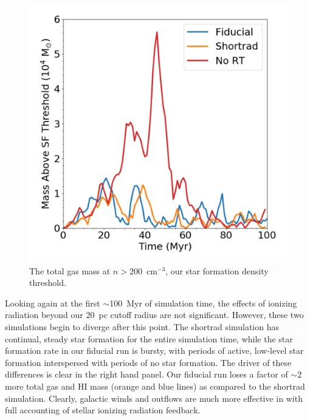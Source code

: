 \documentclass[twocolumn]{aastex62}
\begin{document}
\begin{figure}
\centering
\includegraphics[width=0.99\linewidth]{mass_density_cut}
\caption{The total gas mass at $n > 200$~cm$^{-3}$, our star formation density threshold.}
\label{fig:sf gas}
\end{figure}

Looking again at the first $\sim$100~Myr of simulation time, the effects of ionizing radiation beyond our 20~pc cutoff radius are not significant. However, these two simulations begin to diverge after this point. The shortrad simulation has continual, steady star formation for the entire simulation time, while the star formation rate in our fiducial run is bursty, with periods of active, low-level star formation interspersed with periods of no star formation. The driver of these differences is clear in the right hand panel. Our fiducial run loses a factor of $\sim 2$ more total gas and HI mass (orange and blue lines) as compared to the shortrad simulation. Clearly, galactic winds and outflows are much more effective in with full accounting of stellar ionizing radiation feedback.
\end{document}
